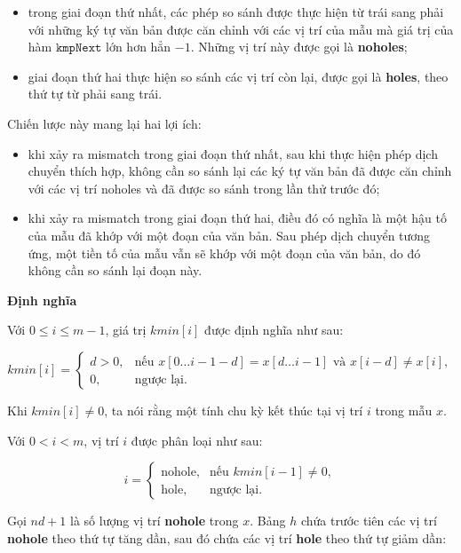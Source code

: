 \begin{itemize}
    \item trong giai đoạn thứ nhất, các phép so sánh được thực hiện từ trái sang phải với những ký tự văn bản được căn chỉnh với các vị trí của mẫu mà giá trị của hàm $\texttt{kmpNext}$ lớn hơn hẳn $-1$. Những vị trí này được gọi là \textbf{noholes};
    \item giai đoạn thứ hai thực hiện so sánh các vị trí còn lại, được gọi là \textbf{holes}, theo thứ tự từ phải sang trái.
\end{itemize}

Chiến lược này mang lại hai lợi ích:

\begin{itemize}
    \item khi xảy ra mismatch trong giai đoạn thứ nhất, sau khi thực hiện phép dịch chuyển thích hợp, không cần so sánh lại các ký tự văn bản đã được căn chỉnh với các vị trí noholes và đã được so sánh trong lần thử trước đó;
    \item khi xảy ra mismatch trong giai đoạn thứ hai, điều đó có nghĩa là một hậu tố của mẫu đã khớp với một đoạn của văn bản. Sau phép dịch chuyển tương ứng, một tiền tố của mẫu vẫn sẽ khớp với một đoạn của văn bản, do đó không cần so sánh lại đoạn này.
\end{itemize}

\textbf{Định nghĩa}

Với \(0 \leq i \leq m-1\), giá trị \(kmin[i]\) được định nghĩa như sau:

\[
kmin[i] =
\begin{cases}
d > 0, & \text{nếu } x[0 \ldots i-1-d] = x[d \ldots i-1] 
          \text{ và } x[i-d] \neq x[i], \\
0, & \text{ngược lại.}
\end{cases}
\]

Khi \(kmin[i] \neq 0\), ta nói rằng một tính chu kỳ kết thúc tại vị trí \(i\) trong mẫu \(x\).

Với \(0 < i < m\), vị trí \(i\) được phân loại như sau:

\[
i =
\begin{cases}
\text{nohole}, & \text{nếu } kmin[i-1] \neq 0, \\
\text{hole}, & \text{ngược lại.}
\end{cases}
\]

Gọi \(nd+1\) là số lượng vị trí \textbf{nohole} trong \(x\). Bảng \(h\) chứa trước tiên các vị trí \textbf{nohole} theo thứ tự tăng dần, sau đó chứa các vị trí \textbf{hole} theo thứ tự giảm dần:

